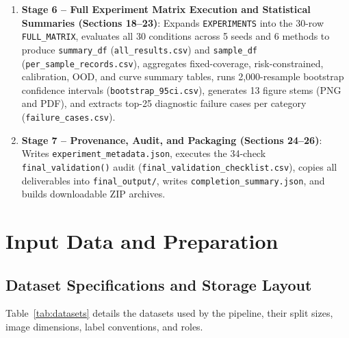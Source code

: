 \documentclass[11pt,a4paper]{article}
\begin{document}
\begin{enumerate}
  \item \textbf{Stage 6 -- Full Experiment Matrix Execution and Statistical Summaries (Sections 18--23)}: Expands \texttt{EXPERIMENTS} into the 30-row \texttt{FULL\_\allowbreak{}MATRIX}, evaluates all 30 conditions across 5 seeds and 6 methods to produce \texttt{summary\_\allowbreak{}df} (\texttt{all\_\allowbreak{}results.\allowbreak{}csv}) and \texttt{sample\_\allowbreak{}df} (\texttt{per\_\allowbreak{}sample\_\allowbreak{}records.\allowbreak{}csv}), aggregates fixed-coverage, risk-constrained, calibration, OOD, and curve summary tables, runs 2,000-resample bootstrap confidence intervals (\texttt{bootstrap\_\allowbreak{}95ci.\allowbreak{}csv}), generates 13 figure stems (PNG and PDF), and extracts top-25 diagnostic failure cases per category (\texttt{failure\_\allowbreak{}cases.\allowbreak{}csv}).
  \item \textbf{Stage 7 -- Provenance, Audit, and Packaging (Sections 24--26)}: Writes \texttt{experiment\_\allowbreak{}metadata.\allowbreak{}json}, executes the 34-check \texttt{final\_\allowbreak{}validation(\allowbreak{})} audit (\texttt{final\_\allowbreak{}validation\_\allowbreak{}checklist.\allowbreak{}csv}), copies all deliverables into \texttt{final\_\allowbreak{}output/\allowbreak{}}, writes \texttt{completion\_\allowbreak{}summary.\allowbreak{}json}, and builds downloadable ZIP archives.
\end{enumerate}

\section{Input Data and Preparation}

\subsection{Dataset Specifications and Storage Layout}

Table~\ref{tab:datasets} details the datasets used by the pipeline, their split sizes, image dimensions, label conventions, and roles.
\end{document}
